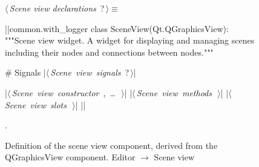 \documentclass[%
    a4paper,    %
    justified,  %
    nobib,      %
    openany     %
]{tufte-book}
\makeatletter
\renewcommand{\label}[1]{\@tufte@label{##1}}%
\makeatother
\begin{document}
\begin{figure}
\begin{flushleft} \small
\begin{minipage}{\linewidth}\label{scrap81}\raggedright\small
{} $\langle\,${\itshape Scene view declarations}\nobreak\ {\footnotesize {?}}$\,\rangle\equiv$
\vspace{-1ex}
\begin{pythoncode}
|\normalfont{}\fontfamily{}|common.with_logger
class SceneView(Qt.QGraphicsView):
    """Scene view widget.
    A widget for displaying and managing scenes including their nodes and
    connections between nodes."""

    # Signals
    |\hbox{$\langle\,${\itshape Scene view signals}\nobreak\ {\footnotesize ?}$\,\rangle$}|

    |\hbox{$\langle\,${\itshape Scene view constructor}\nobreak\ {\footnotesize {}, \ldots\ }$\,\rangle$}|
    |\hbox{$\langle\,${\itshape Scene view methods}\nobreak\ {\footnotesize {}}$\,\rangle$}|
    |\hbox{$\langle\,${\itshape Scene view slots}\nobreak\ {\footnotesize {}}$\,\rangle$}|
|\NWsep|
\end{pythoncode}
\vspace{1.5ex}
\footnotesize
\begin{list}{}{\setlength{\itemsep}{-\parsep}\setlength{\itemindent}{-\leftmargin}}
\item {\NWtxtMacroNoRef}.

\item{}
\end{list}
\end{minipage}\vspace{4ex}
\end{flushleft}
\caption{Definition of the scene view component, derived from the QGraphicsView
  component.
  \newline{}\newline{}Editor $\rightarrow$ Scene view}
\label{editor:lst:scene-view}
\end{figure}
\end{document}
